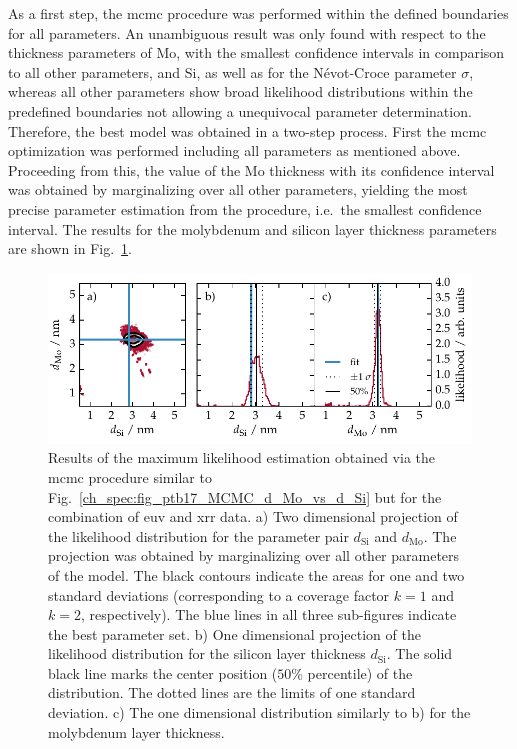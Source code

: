 As a first step, the \gls{mcmc} procedure was performed within the defined boundaries for all parameters. An unambiguous result was only found with respect to the thickness parameters of Mo, with the smallest confidence intervals in comparison to all other parameters, and Si, as well as for the N\'{e}vot-Croce parameter $\sigma$, whereas all other parameters show broad likelihood distributions within the predefined boundaries not allowing a unequivocal parameter determination. Therefore, the best model was obtained in a two-step process. First the \gls{mcmc} optimization was performed including all parameters as mentioned above. Proceeding from this, the value of the Mo thickness with its confidence interval was obtained by marginalizing over all other parameters, yielding the most precise parameter estimation from the procedure, i.e.~the smallest confidence interval. The results for the molybdenum and silicon layer thickness parameters are shown in Fig.~\ref{ch_spec:fig_Mo_Si_C_d_Mo_vs_d_Si}.
\begin{figure}[htbp]
\centering
\includegraphics{img/Mo_Si_C_d_Mo_vs_d_Si}
\caption[Results of the maximum likelihood estimation by combination of XRR and EUV reflectivity for the Mo/Si/C samples.]{Results of the maximum likelihood estimation obtained via the \gls{mcmc} procedure similar to Fig.~\ref{ch_spec:fig_ptb17_MCMC_d_Mo_vs_d_Si} but for the combination of \gls{euv} and \gls{xrr} data. a) Two dimensional projection of the likelihood distribution for the parameter pair $d_\text{Si}$ and $d_\text{Mo}$. The projection was obtained by marginalizing over all other parameters of the model. The black contours indicate the areas for one and two standard deviations (corresponding to a coverage factor $k=1$ and $k=2$, respectively). The blue lines in all three sub-figures indicate the best parameter set. b) One dimensional projection of the likelihood distribution for the silicon layer thickness $d_\text{Si}$. The solid black line marks the center position ($50\%$ percentile) of the distribution. The dotted lines are the limits of one standard deviation. c) The one dimensional distribution similarly to b) for the molybdenum layer thickness.}
\label{ch_spec:fig_Mo_Si_C_d_Mo_vs_d_Si}
\end{figure}
